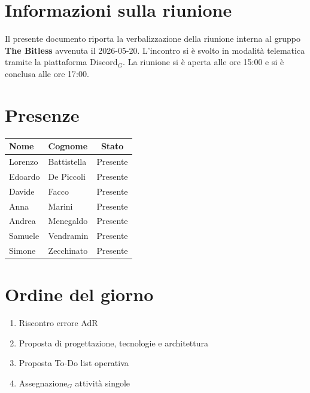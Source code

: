 \documentclass[a4paper, 10pt, colorlinks=true, linkcolor=black, urlcolor=blue, citecolor=blue, hidelinks]{article}
\begin{document}
\newcommand{\titolo}{Verbale interno}
\newcommand{\dataverbale}{2026-05-20}
\newcommand{\dataversione}{2026-05-20}
\newcommand{\versione}{1.0.0}
\newcommand{\stato}{Approvato}
\newcommand{\destinatari}{The Bitless, prof. Tullio Vardanega, prof. Riccardo Cardin}
\def\templatedir{../../../../templates}

\begin{titlepage}

\end{titlepage}

\newpage
\tableofcontents 

\newpage
{}
\section{Informazioni sulla riunione}
Il presente documento riporta la verbalizzazione della riunione interna al gruppo \textbf{The Bitless} avvenuta il \dataverbale{}. L'incontro si è svolto in modalità telematica tramite la piattaforma Discord$_G$. La riunione si è aperta alle ore 15:00 e si è conclusa alle ore 17:00.

\section{Presenze}
\begin{center}
\begin{tabular}{|l|l|c|}
\hline
\textbf{Nome} & \textbf{Cognome} & \textbf{Stato} \\
\hline
Lorenzo & Battistella & Presente \\
Edoardo & De Piccoli & Presente \\
Davide & Facco & Presente \\
Anna & Marini & Presente \\
Andrea & Menegaldo & Presente \\
Samuele & Vendramin & Presente \\
Simone & Zecchinato & Presente \\
\hline
\end{tabular}
\end{center}

\section{Ordine del giorno}
\begin{enumerate}
    \item Riscontro errore AdR
    \item Proposta di progettazione, tecnologie e architettura
    \item Proposta To-Do list operativa
    \item Assegnazione$_G$ attività singole
\end{enumerate}
\end{document}
